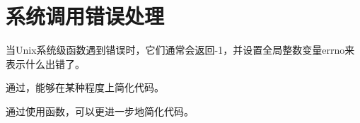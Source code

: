 
\section{系统调用错误处理}
{
    当Unix系统级函数遇到错误时，它们通常会返回-1，并设置全局整数变量errno来表示什么出错了。

    通过，能够在某种程度上简化代码。

    通过使用函数，可以更进一步地简化代码。
}
